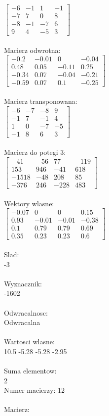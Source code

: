 \documentclass[a4paper,12pt]{article}
\begin{document}
$\begin{bmatrix} -6&-1&1&-1\\-7&7&0&8\\-8&-1&-7&6\\9&4&-5&3 \end{bmatrix}$
\\
\\
Macierz odwrotna:\\

$\begin{bmatrix} -0.2&-0.01&0&-0.04\\0.48&0.05&-0.11&0.25\\-0.34&0.07&-0.04&-0.21\\-0.59&0.07&0.1&-0.25 \end{bmatrix}$
\\
\\
Macierz transponowana:\\

$\begin{bmatrix} -6&-7&-8&9\\-1&7&-1&4\\1&0&-7&-5\\-1&8&6&3 \end{bmatrix}$
\\
\\
Macierz do potegi 3:\\

$\begin{bmatrix} -41&-56&77&-119\\153&946&-41&618\\-1518&-48&208&85\\-376&246&-228&483 \end{bmatrix}$
\\
\\
Wektory wlasne:\\

$\begin{bmatrix} -0.07&0&0&0.15\\0.93&-0.01&-0.01&-0.38\\0.1&0.79&0.79&0.69\\0.35&0.23&0.23&0.6 \end{bmatrix}$
\\
\\
Slad:\\
-3
\\
\\
Wyznacznik:\\
-1602
\\
\\
Odwracalnosc:\\
Odwracalna
\\
\\
Wartosci wlasne:\\
10.5 -5.28 -5.28 -2.95
\\
\\
Suma elementow:\\
2
\\
\newpage
Numer macierzy:
12
\\
\\
Macierz:\\
\end{document}
